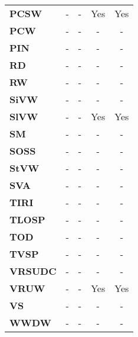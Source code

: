 \begin{table}[ht!]
\begin{tabular}{lcccc}
\textbf{PCSW}          & -                  & -            & Yes          & Yes             \\
\textbf{PCW}           & -                  & -            & -            & -               \\
\textbf{PIN}           & -                  & -            & -            & -               \\
\textbf{RD}            & -                  & -            & -            & -               \\
\textbf{RW}            & -                  & -            & -            & -               \\
\textbf{SiVW}          & -                  & -            & -            & -               \\
\textbf{SlVW}          & -                  & -            & Yes          & Yes             \\
\textbf{SM}            & -                  & -            & -            & -               \\
\textbf{SOSS}          & -                  & -            & -            & -               \\
\textbf{StVW}          & -                  & -            & -            & -               \\
\textbf{SVA}           & -                  & -            & -            & -               \\
\textbf{TIRI}          & -                  & -            & -            & -               \\
\textbf{TLOSP}         & -                  & -            & -            & -               \\
\textbf{TOD}           & -                  & -            & -            & -               \\
\textbf{TVSP}          & -                  & -            & -            & -               \\
\textbf{VRSUDC}        & -                  & -            & -            & -               \\
\textbf{VRUW}          & -                  & -            & Yes          & Yes             \\
\textbf{VS}            & -                  & -            & -            & -               \\
\textbf{WWDW}          & -                  & -            & -            & -               \\
\hline
\end{tabular}
\end{table}

